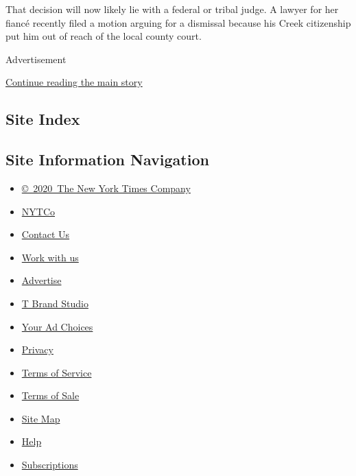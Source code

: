 That decision will now likely lie with a federal or tribal judge. A
lawyer for her fiancé recently filed a motion arguing for a dismissal
because his Creek citizenship put him out of reach of the local county
court.

Advertisement

\protect\hyperlink{after-bottom}{Continue reading the main story}

\hypertarget{site-index}{%
\subsection{Site Index}\label{site-index}}

\hypertarget{site-information-navigation}{%
\subsection{Site Information
Navigation}\label{site-information-navigation}}

\begin{itemize}
\tightlist
\item
  \href{https://help.nytimes.com/hc/en-us/articles/115014792127-Copyright-notice}{©~2020~The
  New York Times Company}
\end{itemize}

\begin{itemize}
\tightlist
\item
  \href{https://www.nytco.com/}{NYTCo}
\item
  \href{https://help.nytimes.com/hc/en-us/articles/115015385887-Contact-Us}{Contact
  Us}
\item
  \href{https://www.nytco.com/careers/}{Work with us}
\item
  \href{https://nytmediakit.com/}{Advertise}
\item
  \href{http://www.tbrandstudio.com/}{T Brand Studio}
\item
  \href{https://www.nytimes.com/privacy/cookie-policy\#how-do-i-manage-trackers}{Your
  Ad Choices}
\item
  \href{https://www.nytimes.com/privacy}{Privacy}
\item
  \href{https://help.nytimes.com/hc/en-us/articles/115014893428-Terms-of-service}{Terms
  of Service}
\item
  \href{https://help.nytimes.com/hc/en-us/articles/115014893968-Terms-of-sale}{Terms
  of Sale}
\item
  \href{https://spiderbites.nytimes.com}{Site Map}
\item
  \href{https://help.nytimes.com/hc/en-us}{Help}
\item
  \href{https://www.nytimes.com/subscription?campaignId=37WXW}{Subscriptions}
\end{itemize}
